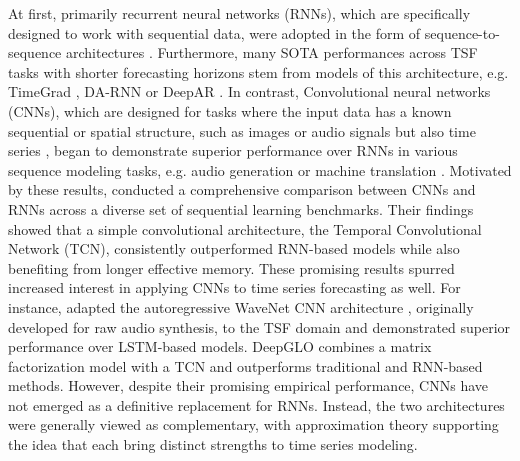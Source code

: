 \documentclass[a4paper,oneside,bibliography=totoc]{scrbook}
\begin{document}
\noindent
At first, primarily recurrent neural networks (RNNs), which are specifically designed to work with sequential data, were adopted in the form of sequence-to-sequence architectures \cite{sutskever_sequence_2014}.
Furthermore, many SOTA performances across TSF tasks with shorter forecasting horizons stem from models of this architecture, e.g. TimeGrad \cite{rasul_autoregressive_2021},  DA-RNN \cite{qin_dual-stage_2017} or DeepAR \cite{salinas_deepar_2020}.
In contrast, Convolutional neural networks (CNNs), which are designed for tasks where the input data has a known sequential or spatial structure, such as images or audio signals \cite{dosovitskiy_image_2021, van_den_oord_wavenet_2016} but also time series \cite{benidis_deep_2022, goodfellow_deep_2016}, began to demonstrate superior performance over RNNs in various sequence modeling tasks, e.g. audio generation or machine translation \cite{van_den_oord_wavenet_2016, kalchbrenner_neural_2017}. 
Motivated by these results, \citet{bai_empirical_2018} conducted a comprehensive comparison between CNNs and RNNs across a diverse set of sequential learning benchmarks. Their findings showed that a simple convolutional architecture, the Temporal Convolutional Network (TCN), consistently outperformed RNN-based models while also benefiting from  longer effective memory.
These promising results spurred increased interest in applying CNNs to time series forecasting as well. 
For instance, \citet{borovykh_conditional_2018} adapted the autoregressive WaveNet CNN architecture \cite{van_den_oord_wavenet_2016}, originally developed for raw audio synthesis, to the TSF domain and demonstrated superior performance over LSTM-based models. 
DeepGLO \cite{sen_think_2019} combines a matrix factorization model with a TCN and outperforms traditional and RNN-based methods.
However, despite their promising empirical performance, CNNs have not emerged as a definitive replacement for RNNs. Instead, the two architectures were generally viewed as complementary, with approximation theory \cite{jiang_approximation_2021} supporting the idea that each bring distinct strengths to time series modeling.
\end{document}
